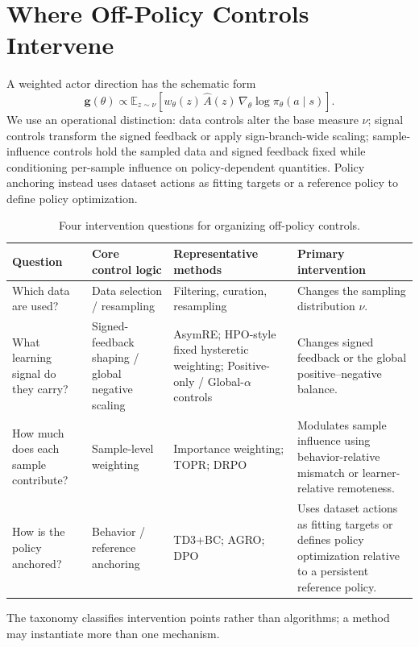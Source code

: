 \documentclass{article}
\theoremstyle{plain}
\theoremstyle{definition}
\theoremstyle{remark}
\begin{document}
\section{Where Off-Policy Controls Intervene}
\label{app:topr_relation}

A weighted actor direction has the schematic form
\[
\mathbf g(\theta)
\propto
\mathbb E_{z\sim\nu}
\left[
    w_\theta(z)\,
    \widehat A(z)\,
    \nabla_\theta\log\pi_\theta(a\mid s)
\right].
\]
We use an operational distinction: data controls alter the base measure
\(\nu\); signal controls transform the signed feedback or apply
sign-branch-wide scaling; sample-influence controls hold the sampled data
and signed feedback fixed while conditioning per-sample influence on
policy-dependent quantities. Policy anchoring instead uses dataset actions
as fitting targets or a reference policy to define policy optimization.

\begin{table}[t]
\centering
\small
\setlength{\tabcolsep}{4pt}
\begin{tabular}{p{}p{}p{}p{}}
\toprule
Question & Core control logic & Representative methods & Primary intervention \\
\midrule
Which data are used?
& Data selection / resampling
& Filtering, curation, resampling
& Changes the sampling distribution \(\nu\). \\
What learning signal do they carry?
& Signed-feedback shaping / global negative scaling
& AsymRE; HPO-style fixed hysteretic weighting; Positive-only / Global-\(\alpha\) controls
& Changes signed feedback or the global positive--negative balance. \\
How much does each sample contribute?
& Sample-level weighting
& Importance weighting; TOPR; DRPO
& Modulates sample influence using behavior-relative mismatch or learner-relative remoteness. \\
How is the policy anchored?
& Behavior / reference anchoring
& TD3+BC; AGRO; DPO
& Uses dataset actions as fitting targets or defines policy optimization relative to a persistent reference policy. \\
\bottomrule
\end{tabular}
\caption{Four intervention questions for organizing off-policy controls.}
\label{tab:off_policy_control_taxonomy}
\end{table}

The taxonomy classifies intervention points rather than algorithms; a method
may instantiate more than one mechanism.
\end{document}
